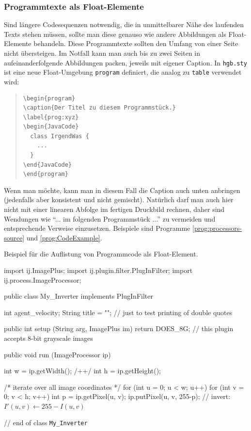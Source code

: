 \subsubsection{Programmtexte als Float-Elemente}
Sind längere Codesequenzen notwendig, die in unmittelbarer Nähe des laufenden Texts
stehen müssen, sollte man diese genauso wie andere Abbildungen als Float-Elemente
behandeln. Diese Programmtexte sollten den Umfang von einer Seite nicht übersteigen.
Im Notfall kann man auch bis zu zwei Seiten in aufeinanderfolgende Abbildungen packen,
jeweils mit eigener Caption. In \texttt{hgb.sty} ist eine neue Float-Umgebung \texttt{program} definiert, die analog zu \texttt{table} verwendet wird:
%
\begin{quote}
\begin{verbatim}
\begin{program}
\caption{Der Titel zu diesem Programmstück.}
\label{prog:xyz}
\begin{JavaCode}
  class IrgendWas {
    ...
  }
\end{JavaCode}
\end{program}
\end{verbatim}
\end{quote}
%
Wenn man möchte, kann man in diesem Fall die Caption auch unten anbringen 
(jedenfalls aber konsistent und nicht gemischt).
Natürlich darf man auch hier nicht mit einer linearen Abfolge im fertigen
Druckbild rechnen, daher sind Wendungen wie
"`... im  folgenden Programmstück ..."' zu vermeiden und entsprechende Verweise
einzusetzen. Beispiele sind Programme \ref{prog:processors-source} und \ref{prog:CodeExample}.

\begin{program}
\caption{Beispiel für die Auflistung von Programmcode als Float-Element.}
\label{prog:CodeExample}
\begin{JavaCode}
import ij.ImagePlus;
import ij.plugin.filter.PlugInFilter;
import ij.process.ImageProcessor;

public class My_Inverter implements PlugInFilter {
	int agent_velocity;
  String title = ""; // just to test printing of double quotes

	public int setup (String arg, ImagePlus im) {
		return DOES_8G;	// this plugin accepts 8-bit grayscale images \label{pr:IjSamplePlugin10}
	}

	public void run (ImageProcessor ip) {
		int w = ip.getWidth();	/+\label{ExampleCodeLabel}+/
		int h = ip.getHeight(); 
		
		/* iterate over all image coordinates */
		for (int u = 0; u < w; u++) { 
			for (int v = 0; v < h; v++) {
				int p = ip.getPixel(u, v); 
				ip.putPixel(u, v, 255-p); // invert: $I'(u,v) \leftarrow 255 - I(u,v)$\label{MathInCode}
			}
		}
	}		
} // end of class {\tt My\_Inverter}
\end{JavaCode}
%
\end{program}


